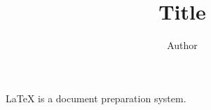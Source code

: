 \documentclass{article}
\title{Title}
\author{Author}
\begin{document}
	\maketitle
	\LaTeX{} is a document preparation system. 
\end{document}
